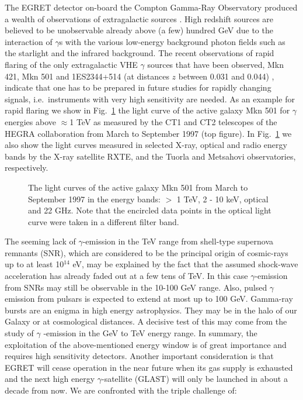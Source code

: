 The EGRET detector on-board the Compton Gamma-Ray 
Observatory produced a wealth of observations of 
extragalactic sources \cite{reimer:97}. 
High  redshift sources are believed to be unobservable already above (a few)
hundred GeV due to the interaction of $\gamma$s with the various low-energy
background photon fields such as the starlight and 
the infrared  background. The recent observations of rapid flaring of the
only extragalactic VHE $\gamma$ sources that have been observed, Mkn 421,
Mkn 501  and 1ES2344+514 (at distances $z$ between  0.031 and 0.044)
\cite{aharonian:97,kerrick:95,gaidos:96,buckley:96,weekes:96a}, 
indicate that one has to be
prepared in future studies for rapidly changing signals, i.e.\ 
instruments with very high sensitivity are needed. 
As an example for rapid flaring we show in Fig.~\ref{fig-501} 
the light curve of the
active galaxy Mkn 501 for $\gamma$ energies above $\approx$1 TeV as
measured by the CT1 and CT2 \Cerenkov telescopes of the HEGRA collaboration
from March to September 1997 (top figure).
In Fig.~\ref{fig-501} 
we also show the light curves measured in selected X-ray, optical and radio
energy bands by the X-ray satellite RXTE, and  
the Tuorla and Metsahovi observatories, respectively.
\begin{figure}[t] \centering \leavevmode
\epsfxsize=11.3cm
\caption{\label{fig-501}
The light curves of the active galaxy Mkn 501 from  March to September 1997
in the energy bands: $>$ 1 TeV, 2 - 10 keV, optical and 22 GHz.
Note that the encircled data points in the optical
light curve were taken in a different filter band. }
\end{figure}

The seeming lack of $\gamma$-emission in the TeV range from  shell-type
supernova remnants (SNR), which are considered to be the principal origin of
cosmic-rays up to at least 10$^{14}$ eV, may be explained by the fact that the
assumed shock-wave  acceleration has already faded out at a few tens of TeV.
In this case $\gamma$-emission from SNRs may  still be observable in the
10-100 GeV range. Also, pulsed $\gamma$ emission
from pulsars is expected to extend at most up to 100 GeV. 
Gamma-ray bursts are an enigma in high energy 
astrophysics. They may be in the halo of our Galaxy or at cosmological
distances.  A decisive test of this may come from the study of $\gamma$
-emission in the GeV to TeV energy range.  In summary, the exploitation
of the above-mentioned energy window is of great importance  and requires
high sensitivity detectors. Another important consideration is that EGRET
will  cease operation in the near future when its gas supply is exhausted
and the next high energy $\gamma$-satellite (GLAST) will only be launched
in about a decade from now.
We are confronted with the triple challenge of:

